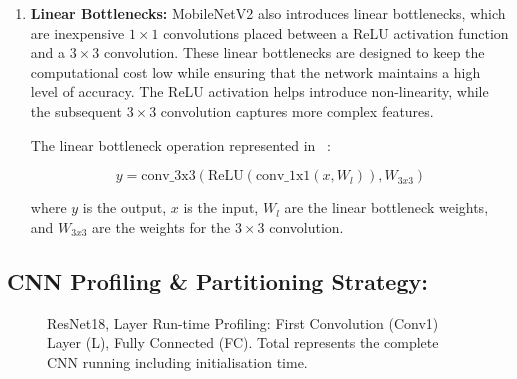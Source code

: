\begin{enumerate}
\item \textbf{Linear Bottlenecks:} MobileNetV2 also introduces linear bottlenecks, which are inexpensive $1\times1$ convolutions placed between a ReLU activation function and a $3\times3$ convolution. These linear bottlenecks are designed to keep the computational cost low while ensuring that the network maintains a high level of accuracy. The ReLU activation helps introduce non-linearity, while the subsequent $3\times3$ convolution captures more complex features.

 The linear bottleneck operation represented in ~:
   
\begin{equation}\label{eq:bottleneck}
y = \text{conv\_3x3}(\text{ReLU}(\text{conv\_1x1}(x, W_{l})), W_{3x3})
\end{equation}
   
   where $y$ is the output, $x$ is the input, $W_{l}$ are the linear bottleneck weights, and $W_{3x3}$ are the weights for the $3\times3$ convolution.
\end{enumerate}





\subsection{CNN Profiling \& Partitioning Strategy:} 
%
\begin{figure}[tb]
    \centering
\resizebox{\columnwidth}{!}{}    %
    \caption[ResNet18 Layer Profiling]{{ResNet18, Layer Run-time Profiling: First Convolution (Conv1) Layer (L), Fully Connected (FC). Total represents the complete CNN running including initialisation time.}}
    \label{fig:Resnet18LayerRuntime}
\end{figure}




